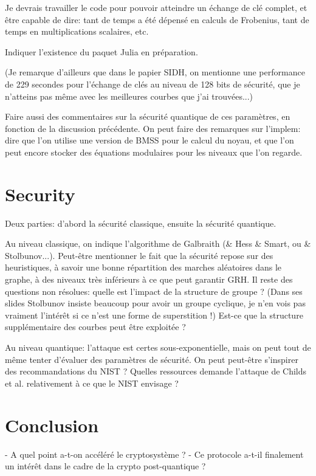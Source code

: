 \documentclass{article}
\begin{document}
Je devrais travailler le code pour pouvoir atteindre un échange de clé
complet, et être capable de dire: tant de temps a été dépensé en
calculs de Frobenius, tant de temps en multiplications scalaires, etc.

Indiquer l'existence du paquet Julia en préparation.

(Je remarque d'ailleurs que dans le papier SIDH, on mentionne une
performance de 229 secondes pour l'échange de clés au niveau de 128
bits de sécurité, que je n'atteins pas même avec les meilleures
courbes que j'ai trouvées...)

Faire aussi des commentaires sur la sécurité quantique de ces
paramètres, en fonction de la discussion précédente.  On peut faire
des remarques sur l'implem: dire que l'on utilise une version de BMSS
pour le calcul du noyau, et que l'on peut encore stocker des équations
modulaires pour les niveaux que l'on regarde.

\section{Security}

Deux parties: d'abord la sécurité classique, ensuite la sécurité quantique.

Au niveau classique, on indique l'algorithme de Galbraith (\& Hess \&
Smart, ou \& Stolbunov...). Peut-être mentionner le fait que la
sécurité repose sur des heuristiques, à savoir une bonne répartition
des marches aléatoires dans le graphe, à des niveaux très inférieurs à
ce que peut garantir GRH.  Il reste des questions non résolues: quelle
est l'impact de la structure de groupe ? (Dans ses slides Stolbunov
insiste beaucoup pour avoir un groupe cyclique, je n'en vois pas
vraiment l'intérêt si ce n'est une forme de superstition !)  Est-ce
que la structure supplémentaire des courbes peut être exploitée ?

Au niveau quantique: l'attaque est certes sous-exponentielle, mais on
peut tout de même tenter d'évaluer des paramètres de sécurité. On peut
peut-être s'inspirer des recommandations du NIST ? Quelles ressources
demande l'attaque de Childs et al. relativement à ce que le NIST
envisage ?


\section{Conclusion}

- A quel point a-t-on accéléré le cryptosystème ?
- Ce protocole a-t-il finalement un intérêt dans le cadre de la crypto post-quantique ?
\end{document}
